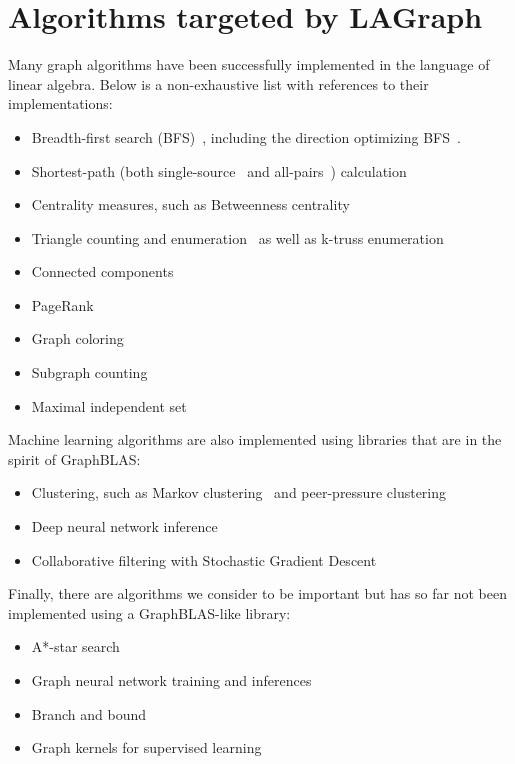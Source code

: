 \section{Algorithms targeted by LAGraph}
\label{sec:algorithms}

Many graph algorithms have been successfully implemented in the language of linear algebra. Below is a non-exhaustive list with references to their implementations:

\begin{itemize}
\item Breadth-first search (BFS)~\cite{bulucc2011parallel, gbtl-cuda16, Davis19}, including the direction optimizing BFS~\cite{Yang:2018:IPE}.
\item Shortest-path (both single-source~\cite{Yang:2019:GBL, ssspgrapl19} and all-pairs~\cite{ca_apsp}) calculation
\item Centrality measures, such as Betweenness centrality~\cite{combblas}
\item Triangle counting and enumeration~\cite{} as well as k-truss enumeration~\cite{}
\item Connected components~\cite{lacc2019}
\item PageRank~\cite{satish2014navigating}
\item Graph coloring~\cite{}
\item Subgraph counting~\cite{chen2019graphblas}
\item Maximal independent set~\cite{jpdc15, Yang:2019:GBL}
\end{itemize}

Machine learning algorithms are also implemented using libraries that are in the spirit of GraphBLAS:
\begin{itemize}
\item Clustering, such as Markov clustering~\cite{azad2018hipmcl} and peer-pressure clustering~\cite{}
\item Deep neural network inference~\cite{kepner2017enabling}
\item Collaborative filtering with Stochastic Gradient Descent~\cite{satish2014navigating}
\end{itemize}

Finally, there are algorithms we consider to be important but has so far not been implemented using a GraphBLAS-like library:
\begin{itemize}
\item A*-star search
\item Graph neural network training and inferences
\item Branch and bound
\item Graph kernels for supervised learning
\end{itemize}
